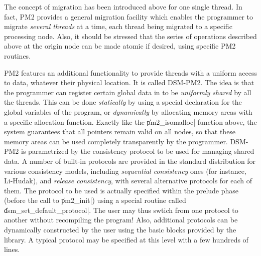 The concept of migration has been introduced above for one single
thread. In fact, PM2 provides a general migration facility which
enables the programmer to migrate \emph{several threads} at a time,
each thread being migrated to a specific processing node. Also, it
should be stressed that the series of operations described above at
the origin node can be made atomic if desired, using specific PM2
routines.

PM2 features an additional functionality to provide threads with a
uniform access to data, whatever their physical location. It is called
DSM-PM2. The idea is that the programmer can register certain global
data in to be \emph{uniformly shared} by all the threads. This can be
done \emph{statically} by using a special declaration for the global
variables of the program, or \emph{dynamically} by allocating memory
areas with a specific allocation function. Exactly like the
\|pm2_isomalloc| function above, the system guarantees that all
pointers remain valid on all nodes, so that these memory areas can be
used completely transparently by the programmer.  DSM-PM2 is
parametrized by the consistency protocol to be used for managing
shared data. A number of built-in protocols are provided in the
standard distribution for various consistency models, including
\emph{sequential consistency} ones (for instance, Li-Hudak), and
\emph{release consistency}, with several alternative protocols for
each of them. The protocol to be used is actually specified within the
prelude phase (before the call to \|pm2_init|) using a special routine
called \|dsm_set_default_protocol|. The user may thus swtich from one
protocol to another without recompiling the program! Also, additional
protocols can be dynamically constructed by the user using the basic
blocks provided by the library. A typical protocol may be specified at
this level with a few hundreds of lines.
